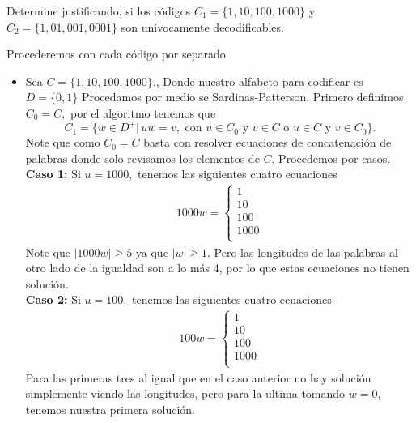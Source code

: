 
Determine justificando, si los códigos $C_1 = \{1, 10, 100, 1000\}$ y $C_2 = \{1, 01, 001, 0001\}$ son univocamente decodificables.
    \begin{sols}
     Procederemos con cada código por separado   
    
    \begin{itemize}
        \item Sea $C=\{1,10,100,1000\}.$, Donde nuestro alfabeto para codificar es $D=\{0,1\}$ Procedamos por medio se Sardinas-Patterson. Primero definimos $C_0=C,$ por el algoritmo tenemos que 
        $$C_1=\{w\in D^+|\,uw=v, \text{ con } u\in C_0 \text{ y } v\in C \text{ o } u\in C \text{ y } v\in C_0 \}.$$
        Note que como $C_0=C$ basta con resolver ecuaciones de concatenación de palabras donde solo revisamos los elementos de $C.$ Procedemos por casos.\\

        \textbf{Caso 1:} Si $u=1000,$ tenemos las siguientes cuatro ecuaciones
        \begin{align*}
            1000w=\begin{cases}
                1\\
                10\\
                100\\
                1000\\
            \end{cases}
        \end{align*}
        Note que $|1000w|\geq 5$ ya que $|w|\geq1.$ Pero las longitudes de las palabras al otro lado de la igualdad son a lo más 4, por lo que estas ecuaciones no tienen solución.\\
        
        \textbf{Caso 2:}
        Si $u=100,$
        tenemos las siguientes cuatro ecuaciones
        \begin{align*}
            100w=\begin{cases}
                1\\
                10\\
                100\\
                1000\\
            \end{cases}
        \end{align*}
        Para las primeras tres al igual que en el caso anterior no hay solución simplemente viendo las longitudes, pero para la ultima tomando $w=0,$ tenemos nuestra primera solución.\\


\end{itemize}
\end{sols}
